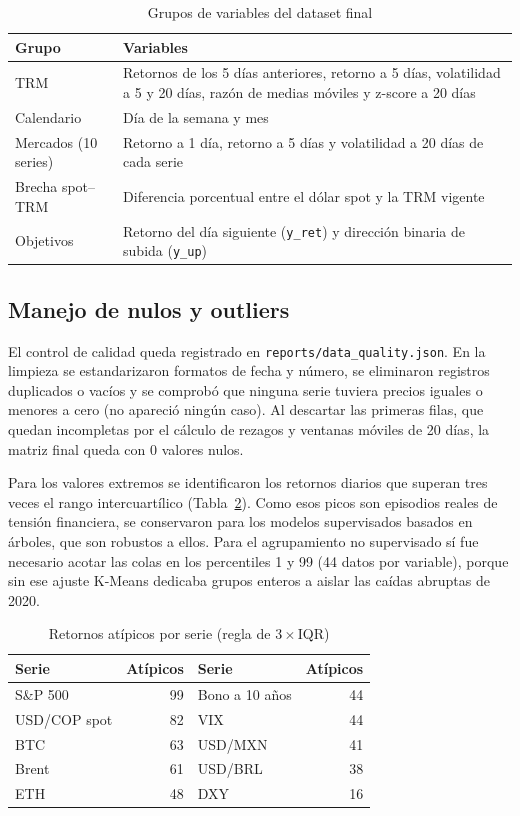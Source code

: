 \documentclass[conference]{IEEEtran}
\begin{document}
\begin{table}[t]
\caption{Grupos de variables del dataset final}
\label{tab:vars}
\centering
\footnotesize
\begin{tabular}{@{}p{1.9cm}p{5.7cm}@{}}
\toprule
Grupo & Variables \\
\midrule
TRM & Retornos de los 5 días anteriores, retorno a 5 días, volatilidad a 5 y 20 días, razón de medias móviles y z-score a 20 días \\
Calendario & Día de la semana y mes \\
Mercados (10 series) & Retorno a 1 día, retorno a 5 días y volatilidad a 20 días de cada serie \\
Brecha spot--TRM & Diferencia porcentual entre el dólar spot y la TRM vigente \\
Objetivos & Retorno del día siguiente (\texttt{y\_ret}) y dirección binaria de subida (\texttt{y\_up}) \\
\bottomrule
\end{tabular}
\end{table}

\subsection{Manejo de nulos y outliers}
El control de calidad queda registrado en \texttt{reports/data\_quality.json}. En la limpieza se estandarizaron formatos de fecha y número, se eliminaron registros duplicados o vacíos y se comprobó que ninguna serie tuviera precios iguales o menores a cero (no apareció ningún caso). Al descartar las primeras filas, que quedan incompletas por el cálculo de rezagos y ventanas móviles de 20 días, la matriz final queda con 0 valores nulos.

Para los valores extremos se identificaron los retornos diarios que superan tres veces el rango intercuartílico (Tabla~\ref{tab:outliers}). Como esos picos son episodios reales de tensión financiera, se conservaron para los modelos supervisados basados en árboles, que son robustos a ellos. Para el agrupamiento no supervisado sí fue necesario acotar las colas en los percentiles 1 y 99 (44 datos por variable), porque sin ese ajuste K-Means dedicaba grupos enteros a aislar las caídas abruptas de 2020.

\begin{table}[t]
\caption{Retornos atípicos por serie (regla de $3\times$IQR)}
\label{tab:outliers}
\centering
\footnotesize
\begin{tabular}{@{}lrlr@{}}
\toprule
Serie & Atípicos & Serie & Atípicos \\
\midrule
S\&P 500 & 99 & Bono a 10 años & 44 \\
USD/COP spot & 82 & VIX & 44 \\
BTC & 63 & USD/MXN & 41 \\
Brent & 61 & USD/BRL & 38 \\
ETH & 48 & DXY & 16 \\
\bottomrule
\end{tabular}
\end{table}
\end{document}
